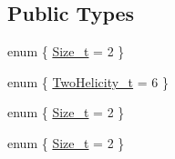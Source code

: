 \subsection*{Public Types}
\begin{DoxyCompactItemize}
\item 
enum \{ \mbox{\hyperlink{structHadron_1_1H3D4E2Rep_aaa36ed3b3e0a39ca70e000626d0f032aa63fe4b8eeebffb6580d55624e6ed40ca}{Size\+\_\+t}} = 2
 \}
\item 
enum \{ \mbox{\hyperlink{structHadron_1_1H3D4E2Rep_a37305c91102d29cbdf3a10e9490c5bc7a479c5b01ef9d3978f9ec364a20fe3efc}{Two\+Helicity\+\_\+t}} = 6
 \}
\item 
enum \{ \mbox{\hyperlink{structHadron_1_1H3D4E2Rep_aaa36ed3b3e0a39ca70e000626d0f032aa63fe4b8eeebffb6580d55624e6ed40ca}{Size\+\_\+t}} = 2
 \}
\item 
enum \{ \mbox{\hyperlink{structHadron_1_1H3D4E2Rep_aaa36ed3b3e0a39ca70e000626d0f032aa63fe4b8eeebffb6580d55624e6ed40ca}{Size\+\_\+t}} = 2
 \}
\end{DoxyCompactItemize}
